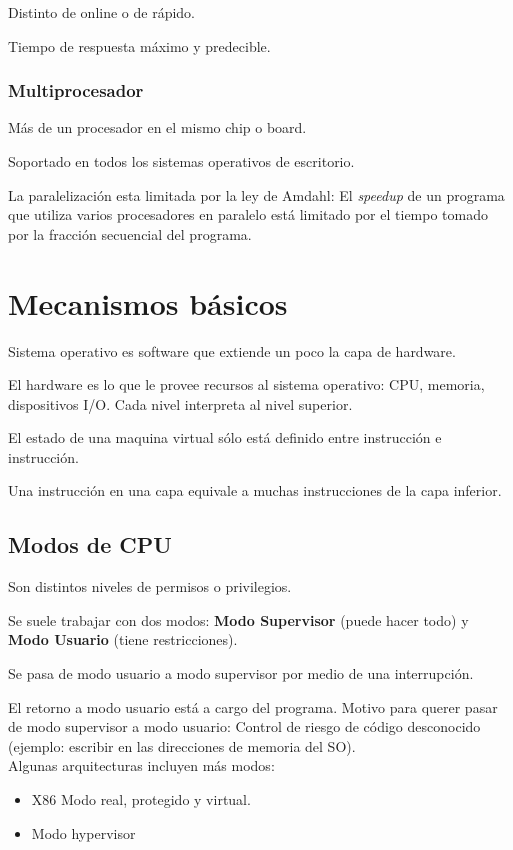 \documentclass[a4paper, twoside]{article}
\begin{document}
Distinto de online o de rápido.

Tiempo de respuesta máximo y predecible.

\subsubsection{Multiprocesador}

Más de un procesador en el mismo chip o board.

Soportado en todos los sistemas operativos de escritorio.

La paralelización esta limitada por la ley de Amdahl: El \emph{speedup} de un
programa que utiliza varios procesadores en paralelo está limitado por el
tiempo tomado por la fracción secuencial del programa.

\newpage
\section{Mecanismos básicos}

Sistema operativo es software que extiende un poco la capa de hardware.

El hardware es lo que le provee recursos al sistema operativo: CPU, memoria,
dispositivos I/O. Cada nivel interpreta al nivel superior.

El estado de una maquina virtual sólo está definido entre instrucción e
instrucción.

Una instrucción en una capa equivale a muchas instrucciones de la capa inferior.

\subsection{Modos de CPU}

Son distintos niveles de permisos o privilegios.

Se suele trabajar con dos modos: \textbf{Modo Supervisor} (puede hacer todo) y
\textbf{Modo Usuario} (tiene restricciones).

Se pasa de modo usuario a modo supervisor por medio de una interrupción.

El retorno a modo usuario está a cargo del programa.
Motivo para querer pasar de modo supervisor a modo usuario: Control de riesgo
de código desconocido (ejemplo: escribir en las direcciones de memoria del
SO).\\

Algunas arquitecturas incluyen más modos:

\begin{itemize}
  \item X86 Modo real, protegido y virtual.
  \item Modo hypervisor
\end{itemize}
\end{document}
